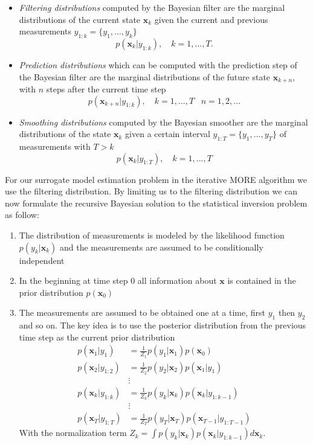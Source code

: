 \begin{itemize}
\item \textit{Filtering distributions} computed by the
  Bayesian filter are the marginal distributions of the
  current state $\mathbf{x}_k$ given the current and previous measurements
  $y_{1:k} = \{y_1,...,y_k\}$
  $$ p(\mathbf{x}_k | y_{1:k}), \quad k = 1,...,T.$$
\item \textit{Prediction distributions} which can be computed with
  the prediction step of the Bayesian filter are the marginal
  distributions of the future state $\mathbf{x}_{k+n}$, with $n$ steps
  after the current time step
  $$ p(\mathbf{x}_{k+n} | y_{1:k}), \quad k = 1,...,T \;\;\; n = 1,2,...$$
\item \textit{Smoothing distributions} computed by the Bayesian smoother
  are the marginal distributions of the state $\mathbf{x}_k$ given
  a certain interval $y_{1:T} = \{y_1,...,y_T\}$ of measurements with
  $T > k$
  $$ p(\mathbf{x}_k | y_{1:T}), \quad k = 1,...,T$$
\end{itemize}

For our surrogate model estimation problem in the iterative MORE
algorithm we use the filtering distribution.
By limiting us to the filtering distribution we can now
formulate the recursive Bayesian solution
to the statistical inversion problem as follow:
\begin{enumerate}
\item The distribution of measurements is modeled by the likelihood
  function $p(y_k | \mathbf{x}_k)$ and the measurements are assumed
  to be conditionally independent
\item In the beginning at time step 0 all information about $\mathbf{x}$
  is contained in the prior distribution $p(\mathbf{x}_0)$
\item The measurements are assumed to be obtained one at a time,
  first $y_1$ then $y_2$ and so on. The key idea is to use the posterior
  distribution from the previous time step as the current prior
  distribution
  \begin{align*}
    p(\mathbf{x}_1 | y_{1}) &= \frac{1}{Z_1} p(y_1 | \mathbf{x}_1) p(\mathbf{x}_0) \\
    p(\mathbf{x}_2 | y_{1:2}) &= \frac{1}{Z_2} p(y_2 | \mathbf{x}_2) p(\mathbf{x}_1 | y_1) \\
                            &\vdots \\
    p(\mathbf{x}_k | y_{1:k}) &= \frac{1}{Z_k} p(y_k | \mathbf{x}_k)
                                p(\mathbf{x}_k | y_{1:k-1}) \\
                            &\vdots \\
    p(\mathbf{x}_T | y_{1:T}) &= \frac{1}{Z_T} p(y_T | \mathbf{x}_T) p(\mathbf{x}_{T-1} | y_{1:T-1})
  \end{align*}
  With the normalization term $Z_k = \int p(y_k | \mathbf{x}_k)
  p(\mathbf{x}_k | y_{1:k-1})
  d \mathbf{x}_k$. 
\end{enumerate}

